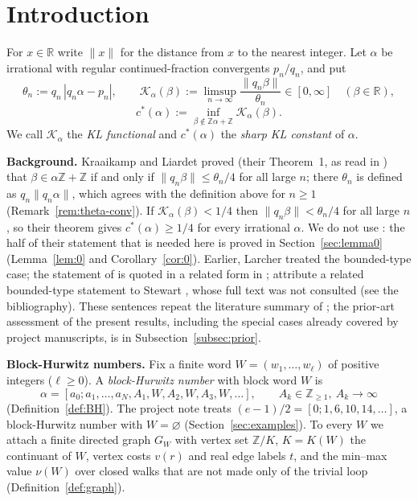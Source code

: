 \documentclass[11pt]{amsart}
\theoremstyle{definition}
\theoremstyle{remark}
\newcommand{\Z}{\mathbb{Z}}
\newcommand{\R}{\mathbb{R}}
\newcommand{\dist}[1]{\lVert #1\rVert}
\newcommand{\KL}{\mathcal{K}}
\begin{document}
\section{Introduction}\label{sec:intro}

For $x\in\R$ write $\dist{x}$ for the distance from $x$ to the nearest integer. Let $\alpha$ be
irrational with regular continued-fraction convergents $p_n/q_n$, and put
\[
\theta_n:=q_n\,|q_n\alpha-p_n|,\qquad
\KL_\alpha(\beta):=\limsup_{n\to\infty}\frac{\dist{q_n\beta}}{\theta_n}\in[0,\infty]\quad(\beta\in\R),
\]
\[
c^*(\alpha):=\inf_{\beta\notin\Z\alpha+\Z}\KL_\alpha(\beta).
\]
We call $\KL_\alpha$ the \emph{KL functional} and $c^*(\alpha)$ the \emph{sharp KL constant} of $\alpha$.

\medskip\noindent\textbf{Background.} Kraaikamp and Liardet \cite{KL} proved (their Theorem~1, as read in
\cite{D5}) that $\beta\in\alpha\Z+\Z$ if and only if $\dist{q_n\beta}\le\theta_n/4$ for all large $n$; there
$\theta_n$ is defined as $q_n\dist{q_n\alpha}$, which agrees with the definition above for $n\ge1$
(Remark~\ref{rem:theta-conv}). If $\KL_\alpha(\beta)<1/4$ then $\dist{q_n\beta}<\theta_n/4$ for all large $n$,
so their theorem gives $c^*(\alpha)\ge1/4$ for every irrational $\alpha$. We do not use \cite{KL}: the half
of their statement that is needed here is proved in Section~\ref{sec:lemma0} (Lemma~\ref{lem:0} and
Corollary~\ref{cor:0}). Earlier, Larcher \cite{Larcher} treated the bounded-type case; the statement of
\cite{KL} is quoted in a related form in \cite{BDS}; \cite{KL} attribute a related bounded-type statement to
Stewart \cite{Stewart}, whose full text was not consulted (see the bibliography).
These sentences repeat the literature summary of \cite{D5}; the prior-art assessment of the present results,
including the special cases already covered by project manuscripts, is in Subsection~\ref{subsec:prior}.

\medskip\noindent\textbf{Block-Hurwitz numbers.} Fix a finite word $W=(w_1,\dots,w_\ell)$ of positive
integers ($\ell\ge0$). A \emph{block-Hurwitz number} with block word $W$ is
\[
\alpha=[a_0;a_1,\dots,a_N,A_1,W,A_2,W,A_3,W,\dots],\qquad A_k\in\Z_{\ge1},\ A_k\to\infty
\]
(Definition~\ref{def:BH}). The project note \cite{D5} treats $(e-1)/2=[0;1,6,10,14,\dots]$, a block-Hurwitz
number with $W=\varnothing$ (Section~\ref{sec:examples}). To every $W$ we attach a finite directed graph
$G_W$ with vertex set $\Z/K$, $K=K(W)$ the continuant of $W$, vertex costs $v(r)$ and real edge labels
$t$, and the min--max value $\nu(W)$ over closed walks that are not made only of the trivial loop
(Definition~\ref{def:graph}).
\end{document}
